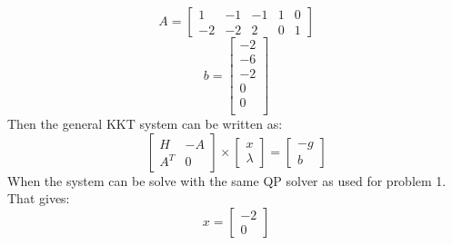 \[A=\begin{bmatrix}
	1 & -1 & -1 & 1 & 0 \\
	-2 & -2 & 2 & 0 & 1
\end{bmatrix}\]
\[b= \begin{bmatrix}
	-2 \\-6 \\-2 \\0 \\0 \\
\end{bmatrix}\]
Then the general KKT system can be written as:
\[\begin{bmatrix}
	H & -A \\A^T & 0
\end{bmatrix}\times
	\begin{bmatrix}
		x\\ \lambda
	\end{bmatrix}=
		\begin{bmatrix}
			-g\\ b
	\end{bmatrix}\]
When the system can be solve with the same QP solver as used for problem 1. That gives:
\[x=\begin{bmatrix}
	-2 \\ 0
\end{bmatrix}\]


